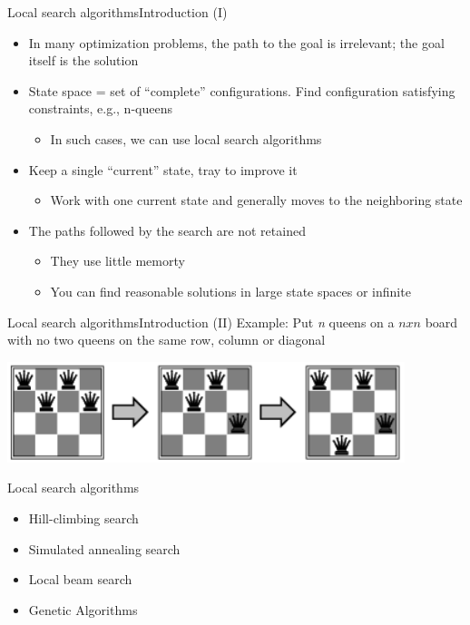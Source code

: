\documentclass[10pt,compress]{beamer} %
\begin{document}
\begin{frame}{Local search algorithms}{Introduction (I)}
    \begin{itemize}
        \item In many optimization problems, the path to the goal is irrelevant; the goal itself is the solution
        \item State space = set of ``complete'' configurations. Find configuration satisfying constraints, e.g., n-queens
            \begin{itemize}
            \item In such cases, we can use \alert{local search algorithms}
            \end{itemize}
        \item Keep a single ``current'' state, tray to improve it
            \begin{itemize}
            \item Work with one current state and generally moves to the neighboring state
            \end{itemize}
        \item The paths followed by the search are not retained
            \begin{itemize}
            \item They use little memorty
            \item You can find reasonable solutions in large state spaces or infinite
            \end{itemize}
    \end{itemize}
\end{frame}

\begin{frame}{Local search algorithms}{Introduction (II)}
    Example: Put \textit{n} queens on a $n x n$ board with no two queens on the same row, column or diagonal
		\begin{center}
		\includegraphics[width=0.7\linewidth]{figs/nqueen.png}
		\end{center}
    Local search algorithms
        \begin{itemize}
        \item Hill-climbing search
        \item Simulated annealing search
        \item Local beam search
        \item Genetic Algorithms
        \end{itemize}
\end{frame}
\end{document}
